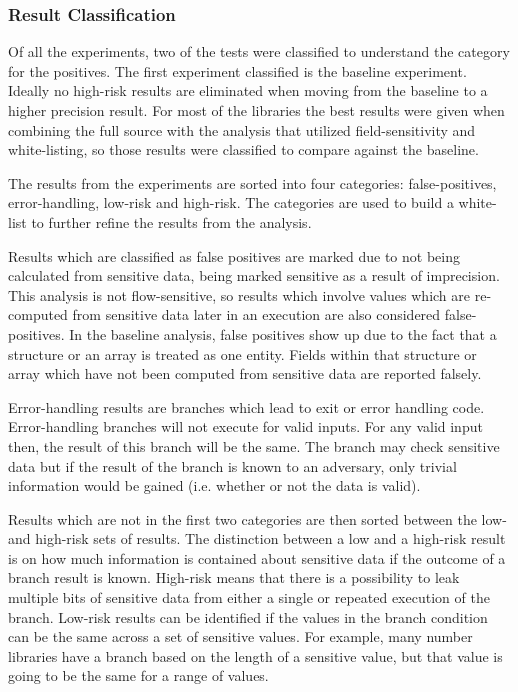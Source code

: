 \subsubsection{Result Classification}
 Of all the experiments, two of the tests were classified to understand the
 category for the positives. The first experiment classified is the baseline
 experiment. Ideally no high-risk results are eliminated when moving from the
 baseline to a higher precision result. For most of the libraries the best
 results were given when combining the full source with the analysis that
 utilized field-sensitivity and white-listing, so those results were classified
 to compare against the baseline.

 The results from the experiments are sorted into four categories:
 false-positives, error-handling, low-risk and high-risk. The categories are used to
 build a white-list to further refine the results from the analysis.

 Results which are classified as false positives are marked due to not being
 calculated from sensitive data, being marked sensitive as a result of
 imprecision. This analysis is not flow-sensitive, so results which involve
 values which are re-computed from sensitive data later in an execution are also
 considered false-positives. In the baseline analysis, false positives show up
 due to the fact that a structure or an array is treated as one entity. Fields
 within that structure or array which have not been computed from sensitive data
 are reported falsely.

 Error-handling results are branches which lead to exit or error handling code.
 Error-handling branches will not execute for valid inputs. For any valid input
 then, the result of this branch will be the same. The branch may check
 sensitive data but if the result of the branch is known to an adversary, only
 trivial information would be gained (i.e. whether or not the data is valid).

 Results which are not in the first two categories are then sorted between the
 low- and high-risk sets of results. The distinction between a low and a
 high-risk result is on how much information is contained about sensitive data
 if the outcome of a branch result is known. High-risk means that there is a
 possibility to leak multiple bits of sensitive data from either a single or
 repeated execution of the branch. Low-risk results can be identified if the
 values in the branch condition can be the same across a set of sensitive
 values. For example, many number libraries have a branch based on the length of
 a sensitive value, but that value is going to be the same for a range of
 values.

